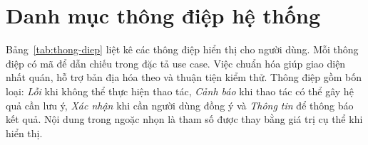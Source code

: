 \section{Danh mục thông điệp hệ thống}\label{pl:thong-diep}

Bảng~\ref{tab:thong-diep} liệt kê các thông điệp hiển thị cho người dùng. Mỗi thông điệp có mã  để dẫn chiếu trong đặc tả use case. Việc chuẩn hóa giúp giao diện nhất quán, hỗ trợ bản địa hóa theo  và thuận tiện kiểm thử. Thông điệp gồm bốn loại: \emph{Lỗi} khi không thể thực hiện thao tác, \emph{Cảnh báo} khi thao tác có thể gây hệ quả cần lưu ý, \emph{Xác nhận} khi cần người dùng đồng ý và \emph{Thông tin} để thông báo kết quả. Nội dung trong ngoặc nhọn là tham số được thay bằng giá trị cụ thể khi hiển thị.

